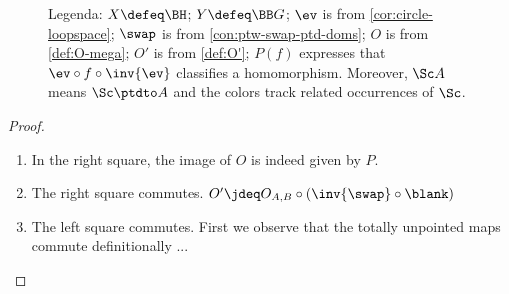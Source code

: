 \def\Scc{\inred{\Sc}}
\begin{figure}[h]
  \caption{\label{fig:bjørn}
  Legenda:
  $X\defeq\BH$;
  $Y\defeq\protect\BB G$;
  $\protect\ev$ is from \cref{cor:circle-loopspace};
  $\swap$ is from \cref{con:ptw-swap-ptd-doms};
  $O$ is from \cref{def:O-mega};
  $O'$ is from \cref{def:O'};
  $P(f)$ expresses that $\protect\ev\circ f\circ \inv{\protect\ev}$
  classifies a homomorphism.
  Moreover, $\Sc A$ means $\Sc\ptdto A$ and the colors track
  related occurrences of $\Sc$.
  }
\end{figure}

\begin{proof}
\begin{enumerate}
\item In the right square, the image of $O$ is indeed given by $P$.
\item The right square commutes.
$O'\jdeq O_{A,B} \circ(\inv{\swap}\circ\blank)$
\item The left square commutes. First we observe that the totally
unpointed maps commute definitionally ...
\end{enumerate}
\end{proof}


